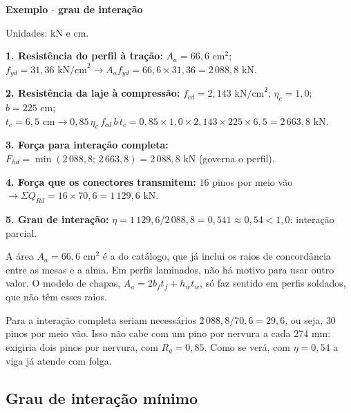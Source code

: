 \documentclass[11pt,a4paper]{article}
\newcommand{\caixaexemplo}[2]{%
  \par\vspace{6pt}\noindent\colorbox{examplebg}{%
    \parbox{\dimexpr\linewidth-2\fboxsep\relax}{%
      \vspace{4pt}\textbf{\color{exampleaccent}#1}\par\vspace{3pt}#2\vspace{4pt}%
    }%
  }\par\vspace{6pt}%
}
\begin{document}
\caixaexemplo{Exemplo $\cdot$ grau de interação}{%
Unidades: kN e cm.\par
\textbf{1. Resistência do perfil à tração:} $A_a = 66{,}6\text{ cm}^2$; $f_{yd} = 31{,}36\text{ kN/cm}^2 \rightarrow A_a f_{yd} = 66{,}6 \times 31{,}36 = 2\,088{,}8\text{ kN}$.\par
\textbf{2. Resistência da laje à compressão:} $f_{cd} = 2{,}143\text{ kN/cm}^2$; $\eta_c = 1{,}0$; $b = 225\text{ cm}$; $t_c = 6{,}5\text{ cm} \rightarrow 0{,}85\,\eta_c\,f_{cd}\,b\,t_c = 0{,}85 \times 1{,}0 \times 2{,}143 \times 225 \times 6{,}5 = 2\,663{,}8\text{ kN}$.\par
\textbf{3. Força para interação completa:} $F_{hd} = \min(2\,088{,}8;\, 2\,663{,}8) = 2\,088{,}8\text{ kN}$ (governa o perfil).\par
\textbf{4. Força que os conectores transmitem:} $16$ pinos por meio vão $\rightarrow \Sigma Q_{Rd} = 16 \times 70{,}6 = 1\,129{,}6\text{ kN}$.\par
\textbf{5. Grau de interação:} $\eta = 1\,129{,}6/2\,088{,}8 = 0{,}541 \approx 0{,}54 < 1{,}0$: interação parcial.}

A área $A_a = 66{,}6\text{ cm}^2$ é a do catálogo, que já inclui os raios de concordância entre as mesas e a alma. Em perfis laminados, não há motivo para usar outro valor. O modelo de chapas, $A_a = 2 b_f t_f + h_w t_w$, só faz sentido em perfis soldados, que não têm esses raios.

Para a interação completa seriam necessários $2\,088{,}8/70{,}6 = 29{,}6$, ou seja, $30$ pinos por meio vão. Isso não cabe com um pino por nervura a cada $274\text{ mm}$: exigiria dois pinos por nervura, com $R_g = 0{,}85$. Como se verá, com $\eta = 0{,}54$ a viga já atende com folga.

\subsection{Grau de interação mínimo}
\end{document}
